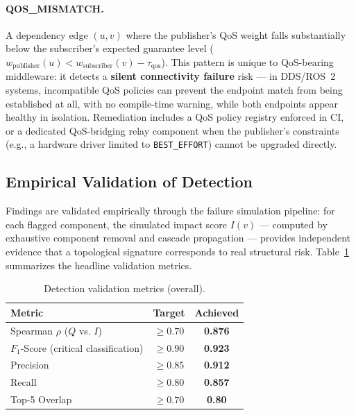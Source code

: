 \documentclass[11pt]{article}
\begin{document}
\paragraph{QOS\_MISMATCH.} A dependency edge $(u, v)$ where the publisher's QoS weight falls
substantially below the subscriber's expected guarantee level ($w_{\text{publisher}}(u) <
w_{\text{subscriber}}(v) - \tau_{\text{qos}}$). This pattern is unique to QoS-bearing middleware: it
detects a \textbf{silent connectivity failure} risk --- in DDS/ROS~2 systems, incompatible QoS policies
can prevent the endpoint match from being established at all, with no compile-time warning, while both
endpoints appear healthy in isolation. Remediation includes a QoS policy registry enforced in CI, or a
dedicated QoS-bridging relay component when the publisher's constraints (e.g., a hardware driver
limited to \texttt{BEST\_EFFORT}) cannot be upgraded directly.

\subsection{Empirical Validation of Detection}

Findings are validated empirically through the failure simulation pipeline: for each flagged
component, the simulated impact score $I(v)$ --- computed by exhaustive component removal and cascade
propagation --- provides independent evidence that a topological signature corresponds to real
structural risk. Table~\ref{tab:detection-validation} summarizes the headline validation metrics.

\begin{table}[htbp]
\centering
\caption{Detection validation metrics (overall).}
\label{tab:detection-validation}
\begin{tabular}{@{}lcc@{}}
\toprule
Metric & Target & Achieved \\
\midrule
Spearman $\rho$ ($Q$ vs. $I$) & $\ge 0.70$ & \textbf{0.876} \\
$F_1$-Score (critical classification) & $\ge 0.90$ & \textbf{0.923} \\
Precision & $\ge 0.85$ & \textbf{0.912} \\
Recall & $\ge 0.80$ & \textbf{0.857} \\
Top-5 Overlap & $\ge 0.70$ & \textbf{0.80} \\
\bottomrule
\end{tabular}
\end{table}
\end{document}
